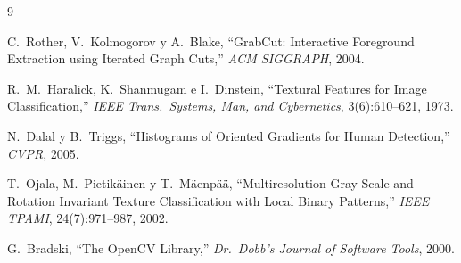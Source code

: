 \documentclass[12pt,a4paper]{article}
\begin{document}
\begin{thebibliography}{9}

  C.~Rother, V.~Kolmogorov y A.~Blake,
  ``GrabCut: Interactive Foreground Extraction using Iterated Graph Cuts,''
  \textit{ACM SIGGRAPH}, 2004.

  R.~M.~Haralick, K.~Shanmugam e I.~Dinstein,
  ``Textural Features for Image Classification,''
  \textit{IEEE Trans.\ Systems, Man, and Cybernetics}, 3(6):610--621, 1973.

  N.~Dalal y B.~Triggs,
  ``Histograms of Oriented Gradients for Human Detection,''
  \textit{CVPR}, 2005.

  T.~Ojala, M.~Pietikäinen y T.~Mäenpää,
  ``Multiresolution Gray-Scale and Rotation Invariant Texture Classification
  with Local Binary Patterns,''
  \textit{IEEE TPAMI}, 24(7):971--987, 2002.

  G.~Bradski, ``The OpenCV Library,''
  \textit{Dr.\ Dobb's Journal of Software Tools}, 2000.

\end{thebibliography}
\end{document}
